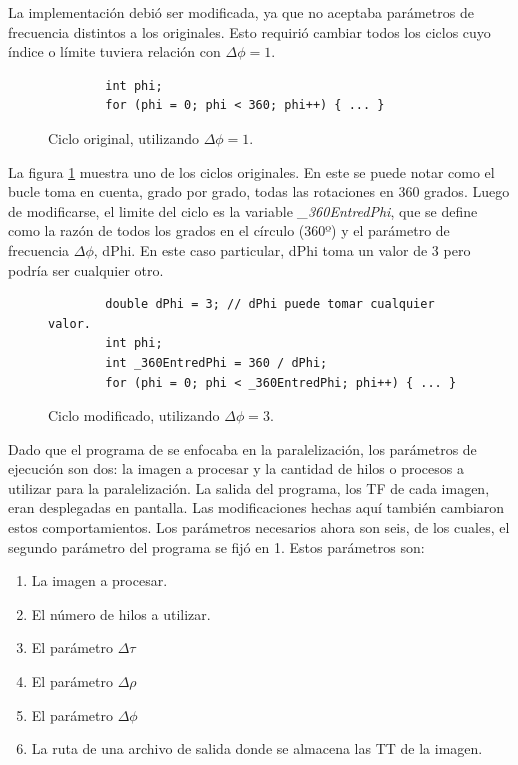 \begin{enumerate}
    La implementación\cite{Garita2014} debió ser modificada, ya que no aceptaba parámetros de frecuencia distintos a los originales. Esto requirió cambiar todos los ciclos cuyo índice o límite tuviera relación con $\Delta \phi = 1$. 

    \begin{figure}
        \begin{lstlisting}
        int phi;
        for (phi = 0; phi < 360; phi++) { ... }
        \end{lstlisting}
        \caption{Ciclo original, utilizando $\Delta \phi =1$.}
        \label{fig:forTT-rgf}
    \end{figure}
    
    
La figura \ref{fig:forTT-rgf} muestra uno de los ciclos originales. En este se puede notar como el bucle toma en cuenta, grado por grado, todas las rotaciones en 360 grados. Luego de modificarse, el limite del ciclo es la variable \textit{\_360EntredPhi}, que se define como la razón de todos los grados en el círculo (360º) y el parámetro de frecuencia $\Delta \phi$, dPhi. En este caso particular, dPhi toma un valor de 3 pero podría ser cualquier otro.
    
    \begin{figure}
        \begin{lstlisting}
        double dPhi = 3; // dPhi puede tomar cualquier valor.
        int phi;
        int _360EntredPhi = 360 / dPhi;
        for (phi = 0; phi < _360EntredPhi; phi++) { ... }
        \end{lstlisting}
        \label{fig:forTT-rrb}
        \caption{Ciclo modificado, utilizando $\Delta \phi = 3$.}
    \end{figure}
    
    Dado que el programa de \cite{Garita2014} se enfocaba en la paralelización, los parámetros de ejecución son dos: la imagen a procesar y la cantidad de hilos o procesos a utilizar para la paralelización. La salida del programa, los TF de cada imagen, eran desplegadas en pantalla.
    Las modificaciones hechas aquí también cambiaron estos comportamientos. Los parámetros necesarios ahora son seis, de los cuales, el segundo parámetro del programa se fijó en 1. Estos parámetros son:
    \begin{enumerate}
        \item La imagen a procesar. 
        \item El número de hilos a utilizar.
        \item El parámetro $\Delta \tau$
        \item El parámetro $\Delta \rho$
        \item El parámetro $\Delta \phi$
        \item La ruta de una archivo de salida donde se almacena las TT de la imagen.
    \end{enumerate}
    


\end{enumerate}
